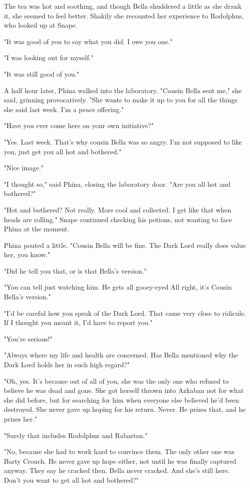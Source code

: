 The tea was hot and soothing, and though Bella shuddered a little as she drank it, she seemed to feel better. Shakily she recounted her experience to Rodolphus, who looked up at Snape.

"It was good of you to say what you did. I owe you one."

"I was looking out for myself."

"It was still good of you."

A half hour later, Phina walked into the laboratory. "Cousin Bella sent me," she said, grinning provocatively. "She wants to make it up to you for all the things she said last week. I'm a peace offering."

"Have you ever come here on your own initiative?"

"Yes. Last week. That's why cousin Bella was so angry. I'm not supposed to like you, just get you all hot and bothered."

"Nice image."

"I thought so," said Phina, closing the laboratory door. "Are you all hot and bothered?"

"Hot and bothered? Not really. More cool and collected. I get like that when heads are rolling." Snape continued checking his potions, not wanting to face Phina at the moment.

Phina pouted a little. "Cousin Bella will be fine. The Dark Lord really does value her, you know."

"Did he tell you that, or is that Bella's version."

"You can tell just watching him. He gets all gooey-eyed{\el} All right, it's Cousin Bella's version."

"I'd be careful how you speak of the Dark Lord. That came very close to ridicule. If I thought you meant it, I'd have to report you."

"You're serious!"

"Always where my life and health are concerned. Has Bella mentioned why the Dark Lord holds her in such high regard?"

"Oh, yes. It's because out of all of you, she was the only one who refused to believe he was dead and gone. She got herself thrown into Azkaban not for what she did before, but for searching for him when everyone else believed he'd been destroyed. She never gave up hoping for his return. Never. He prizes that, and he prizes her."

"Surely that includes Rodolphus and Rabastan."

"No, because she had to work hard to convince them. The only other one was Barty Crouch. He never gave up hope either, not until he was finally captured anyway. They say he cracked then. Bella never cracked. And she's still here. Don't you want to get all hot and bothered?"

